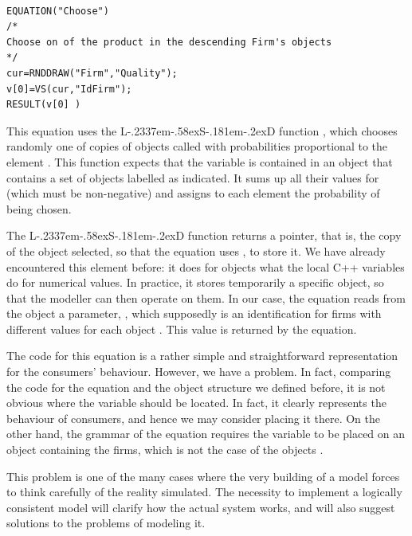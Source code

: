 \documentclass [11pt,a4paper] {book}
\def\LsD{{L\kern-.2337em\lower-.58ex\hbox{S}\kern-.181em\lower-.2ex\hbox{D}}\xspace}
\begin{document}
\begin{minipage}[ht]{10cm}
\small
\begin{verbatim}

EQUATION("Choose")
/*
Choose on of the product in the descending Firm's objects
*/
cur=RNDDRAW("Firm","Quality");
v[0]=VS(cur,"IdFirm");
RESULT(v[0] )

\end{verbatim}
\normalsize
\end{minipage}
 
This equation uses the \LsD function , which chooses randomly one of copies of objects called  with probabilities proportional to the element . This function expects that the variable  is contained in an object that contains a set of objects labelled as indicated. It sums up all their values for  (which must be non-negative) and assigns to each element the probability of being chosen.

The \LsD function  returns a pointer, that is, the copy of the object selected, so that the equation uses , to store it. We have already encountered this element before: it does for objects what the local C++ variables  do for numerical values. In practice, it stores temporarily a specific object, so that the modeller can then operate on them. In our case, the equation reads from the object a parameter, , which supposedly is an identification for firms with different values for each object . This value is returned by the equation.

The code for this equation is a rather simple and straightforward representation for the consumers' behaviour. However, we have a problem. In fact, comparing the code for the equation and the object structure we defined before, it is not obvious where the variable  should be located. In fact, it clearly represents the behaviour of consumers, and hence we may consider placing it there. On the other hand, the grammar of the equation requires the variable to be placed on an object containing the firms, which is not the case of the objects . 

This problem is one of the many cases where the very building of a model forces to think carefully of the reality simulated. The necessity to implement a logically consistent model will clarify how the actual system works, and will also suggest solutions to the problems of modeling it.
\end{document}
